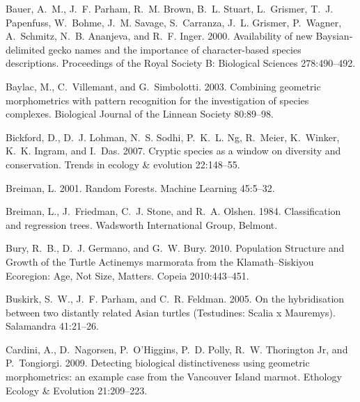 \documentclass[12pt,letterpaper]{article}
\begin{document}
\begin{thebibliography}{77}
Bauer, A.~M., J.~F. Parham, R.~M. Brown, B.~L. Stuart, L.~Grismer, T.~J.
  Papenfuss, W.~Bohme, J.~M. Savage, S.~Carranza, J.~L. Grismer, P.~Wagner,
  A.~Schmitz, N.~B. Ananjeva, and R.~F. Inger. 2000. {Availability of new
  Baysian-delimited gecko names and the importance of character-based species
  descriptions}. Proceedings of the Royal Society B: Biological Sciences
  278:490--492.

Baylac, M., C.~Villemant, and G.~Simbolotti. 2003. {Combining geometric
  morphometrics with pattern recognition for the investigation of species
  complexes}. Biological Journal of the Linnean Society 80:89--98.

Bickford, D., D.~J. Lohman, N.~S. Sodhi, P.~K.~L. Ng, R.~Meier, K.~Winker,
  K.~K. Ingram, and I.~Das. 2007. {Cryptic species as a window on diversity and
  conservation.} Trends in ecology \& evolution 22:148--55.

Breiman, L. 2001. {Random Forests}. Machine Learning 45:5--32.

Breiman, L., J.~Friedman, C.~J. Stone, and R.~A. Olshen. 1984. {Classification
  and regression trees}. Wadsworth International Group, Belmont.

Bury, R.~B., D.~J. Germano, and G.~W. Bury. 2010. {Population Structure and
  Growth of the Turtle Actinemys marmorata from the Klamath–Siskiyou
  Ecoregion: Age, Not Size, Matters}. Copeia 2010:443--451.

Buskirk, S.~W., J.~F. Parham, and C.~R. Feldman. 2005. {On the hybridisation
  between two distantly related Asian turtles (Testudines: Scalia x Mauremys)}.
  Salamandra 41:21--26.

Cardini, A., D.~Nagorsen, P.~O'Higgins, P.~D. Polly, R.~W. {Thorington Jr}, and
  P.~Tongiorgi. 2009. {Detecting biological distinctiveness using geometric
  morphometrics: an example case from the Vancouver Island marmot}. Ethology
  Ecology \& Evolution 21:209--223.


\end{thebibliography}
\end{document}
